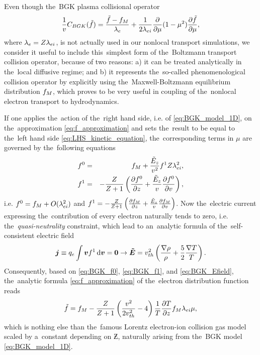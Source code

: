 Even though the~BGK plasma collisional operator \cite{BGK_1954}
\begin{equation}
  \frac{1}{v}C_{BGK}(\tilde{f})
  =
  \frac{\tilde{f} - f_M}{\lambda_e}
  + \frac{1}{2 \lambda_{ei}}
  \frac{\partial{}}{\partial{\mu}}(1 - \mu^2)\frac{\partial{\tilde{f}}}{\partial{\mu}} ,
  \label{eq:BGK_model_1D}
\end{equation}
where $\lambda_e = Z \lambda_{ei}$, 
is not actually used in our nonlocal transport simulations, we consider it 
useful to include this~simplest form of the~Boltzmann transport collision 
operator, because of two reasons: a) it can be treated analytically in 
the~local diffusive regime; and b) it represents the~so-called phenomenological
collision operator by explicitly using the~Maxwell-Boltzmann equilibrium 
distribution $f_M$, which proves to be very useful in coupling of the~nonlocal 
electron transport to hydrodynamics.

If one applies the~action of the~right hand side, i.e. of 
\eqref{eq:BGK_model_1D}, 
on the~approximation \eqref{eq:f_approximation} and sets the~result to be equal 
to the~left hand side \eqref{eq:LHS_kinetic_equation}, the~corresponding terms
in $\mu$ are governed by the~following equations
\begin{eqnarray}
  f^0 &=& f_M + \frac{\tilde{E}_z}{v^2}f^1 Z\lambda_{ei}^2 ,
  \label{eq:BGK_f0} \\
  f^1 &=& - \frac{Z}{Z+1}
  \left( \frac{\partial{f^0}}{\partial{z}} + \frac{\tilde{E}_z}{v}\frac{\partial{f^0}}{\partial{v}} \right) , 
  \label{eq:BGK_f1}
\end{eqnarray}
i.e. $f^0 = f_M + O(\lambda_{ei}^2)$ and $f^1 = - \frac{Z}{Z+1}
  \left( \frac{\partial{f_M}}{\partial{z}} + \frac{\tilde{E}_z}{v}\frac{\partial{f_M}}{\partial{v}} \right)$.
Now the~electric current expressing the~contribution of every electron 
naturally tends to zero, i.e. the~\textit{quasi-neutrality} constraint, 
which lead to an~analytic formula of the~self-consistent electric field
\begin{multline}
\boldsymbol{j} \equiv q_e \int \boldsymbol{v} f^1 \, \text{d}\boldsymbol{v} = \boldsymbol{0}  \rightarrow
\boldsymbol{\tilde{E}} = v_{th}^2\left(\frac{\nabla\rho}{\rho} + \frac{5}{2}\frac{\nabla T}{T} 
\right) .
\label{eq:BGK_Efield}
\end{multline}
Consequently, based on \eqref{eq:BGK_f0}, \eqref{eq:BGK_f1}, 
and \eqref{eq:BGK_Efield}, the~analytic formula \eqref{eq:f_approximation}
of the~electron distribution function reads 
\begin{equation}
  \tilde{f} = f_M - \frac{Z}{Z+1}
  \left( \frac{v^2}{2 v_{th}^2} - 4\right)
  \frac{1}{T}\frac{\partial{T}}{\partial{z}}f_M \lambda_{ei} \mu , 
  \label{eq:BGK_approximation}
\end{equation}
which is nothing else than the~famous Lorentz electron-ion collision gas model 
\cite{Lorentz_1905} scaled by a~constant depending on $\Zbar$, 
naturally arising from the~BGK model \eqref{eq:BGK_model_1D}.

